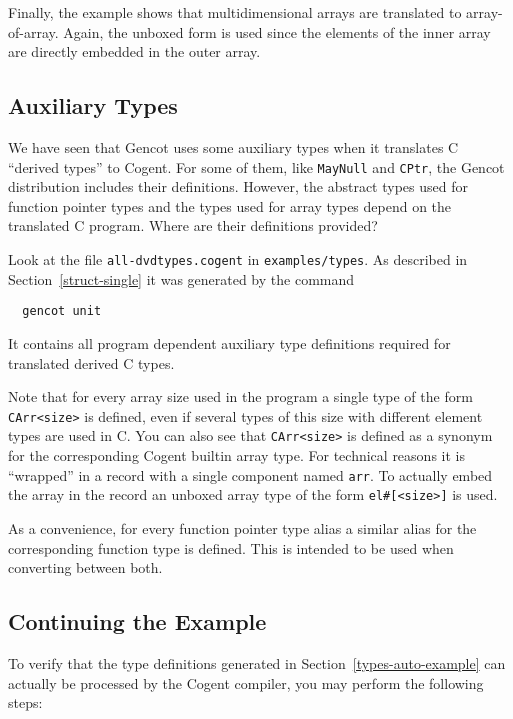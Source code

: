 \documentclass[a4paper]{report}
\newcommand{\code}[1]{\textnormal{\texttt{#1}}}
\begin{document}
Finally, the example shows that multidimensional arrays are translated to array-of-array. Again, the unboxed form is used
since the elements of the inner array are directly embedded in the outer array.

\subsection{Auxiliary Types}
\label{types-auto-gen}

We have seen that Gencot uses some auxiliary types when it translates C ``derived types'' to Cogent. For some of them, like 
\code{MayNull} and \code{CPtr}, the Gencot distribution includes their definitions. However, the abstract types
used for function pointer types and the types used for array types depend on the translated C program. Where
are their definitions provided?

Look at the file \code{all-dvdtypes.cogent} in \code{examples/types}. As described in Section~\ref{struct-single} it was 
generated by the command
\begin{verbatim}
  gencot unit
\end{verbatim}
It contains all program dependent auxiliary type definitions required for translated derived C types. 

Note that for every array
size used in the program a single type of the form \code{CArr<size>} is defined, even if several types of this
size with different element types are used in C. You can also see that \code{CArr<size>} is defined as a synonym
for the corresponding Cogent builtin array type. For technical reasons it is ``wrapped'' in
a record with a single component named \code{arr}. To actually embed the array in the record an unboxed array type
of the form \code{el\#[<size>]} is used. 

As a convenience, for every function pointer type alias a similar alias for the corresponding function type is 
defined. This is intended to be used when converting between both.

\subsection{Continuing the Example}

To verify that the type definitions generated in Section~\ref{types-auto-example} can actually be processed by the 
Cogent compiler, you may perform the following steps:
\end{document}

